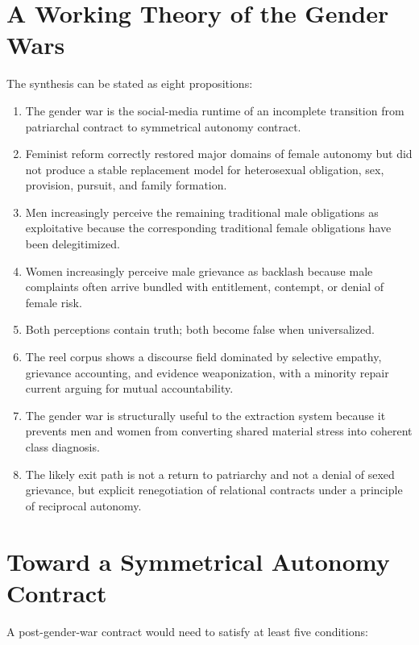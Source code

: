 \documentclass[12pt]{article}
\begin{document}


\section{A Working Theory of the Gender Wars}

The synthesis can be stated as eight propositions:

\begin{enumerate}
  \item The gender war is the social-media runtime of an incomplete transition from patriarchal contract to symmetrical autonomy contract.
  \item Feminist reform correctly restored major domains of female autonomy but did not produce a stable replacement model for heterosexual obligation, sex, provision, pursuit, and family formation.
  \item Men increasingly perceive the remaining traditional male obligations as exploitative because the corresponding traditional female obligations have been delegitimized.
  \item Women increasingly perceive male grievance as backlash because male complaints often arrive bundled with entitlement, contempt, or denial of female risk.
  \item Both perceptions contain truth; both become false when universalized.
  \item The reel corpus shows a discourse field dominated by selective empathy, grievance accounting, and evidence weaponization, with a minority repair current arguing for mutual accountability.
  \item The gender war is structurally useful to the extraction system because it prevents men and women from converting shared material stress into coherent class diagnosis.
  \item The likely exit path is not a return to patriarchy and not a denial of sexed grievance, but explicit renegotiation of relational contracts under a principle of reciprocal autonomy.
\end{enumerate}

\section{Toward a Symmetrical Autonomy Contract}

A post-gender-war contract would need to satisfy at least five conditions:
\end{document}
